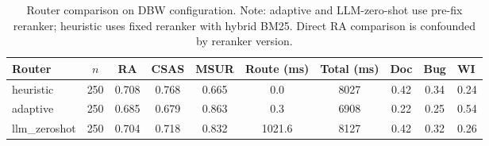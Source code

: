 \begin{table}[t]
\caption{Router comparison on DBW configuration. Note: adaptive and LLM-zero-shot
use pre-fix reranker; heuristic uses fixed reranker with hybrid BM25. Direct RA
comparison is confounded by reranker version.}
\label{tab:router}
\centering
\small
\begin{tabular}{lcccccccc}
\toprule
Router & $n$ & RA & CSAS & MSUR & Route (ms) & Total (ms) & Doc & Bug & WI \\
\midrule
heuristic & 250 & 0.708 & 0.768 & 0.665 & 0.0 & 8027 & 0.42 & 0.34 & 0.24 \\
adaptive & 250 & 0.685 & 0.679 & 0.863 & 0.3 & 6908 & 0.22 & 0.25 & 0.54 \\
llm_zeroshot & 250 & 0.704 & 0.718 & 0.832 & 1021.6 & 8127 & 0.42 & 0.32 & 0.26 \\
\bottomrule
\end{tabular}
\end{table}